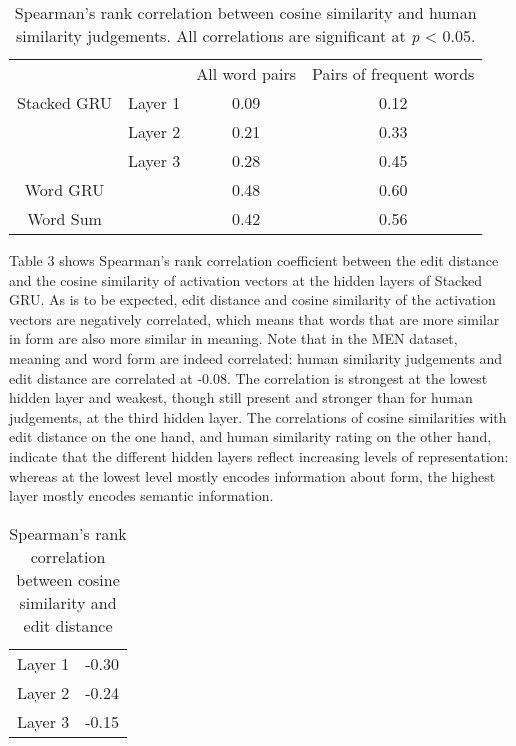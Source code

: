 \begin{table}[]
	\centering
	\begin{tabular}{cccc}
		&& All word pairs & Pairs of frequent words \\
		{\sc Stacked GRU} & Layer 1 & 0.09 & 0.12\\
		& Layer 2 & 0.21 & 0.33 \\
		& Layer 3 & 0.28 & 0.45 \\
		\hline
		{\sc Word GRU} & & 0.48 & 0.60\\
		\hline
		{\sc Word Sum} & & 0.42 & 0.56
	\end{tabular}
	\caption{Spearman's rank correlation between cosine similarity and human similarity judgements. All correlations are significant at \textit{p} < 0.05.} %
\end{table}

Table 3 shows Spearman's rank correlation coefficient between the edit distance and the cosine similarity of activation vectors at the hidden layers of {\sc Stacked GRU}.
As is to be expected, edit distance and cosine similarity of the activation vectors are negatively correlated, which means that words that are more similar in form are also more similar in meaning. Note that in the MEN dataset, meaning and word form are indeed correlated: human similarity judgements and edit distance are correlated at -0.08. The correlation is strongest at the lowest hidden layer and weakest, though still present and stronger than for human judgements, at the third hidden layer. 
The correlations of cosine similarities with edit distance on the one hand, and human similarity rating on the other hand, indicate that the different hidden layers reflect increasing levels of representation: whereas at the lowest level mostly encodes information about form, the highest layer mostly encodes semantic information.


\begin{table}[]
	\centering
	\begin{tabular}{cc}
		Layer 1 & -0.30 \\
		Layer 2 & -0.24 \\
		Layer 3 & -0.15
	\end{tabular}
	\caption{Spearman's rank correlation between cosine similarity and edit distance} %
\end{table}

